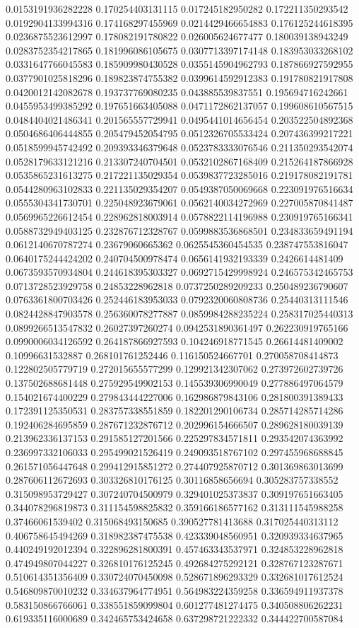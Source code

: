 \begin{table}
\begin{tabu}
\begin{sparkline}{10}
0.0153191936282228 0.170254403131115 0.017245182950282 0.172211350293542 0.0192904133994316 0.174168297455969 0.0214429466654883 0.176125244618395 0.0236875523612997 0.178082191780822 0.026005624677477 0.180039138943249 0.0283752354217865 0.181996086105675 0.0307713397174148 0.183953033268102 0.0331647766045583 0.185909980430528 0.0355145904962793 0.187866927592955 0.0377901025818296 0.189823874755382 0.0399614592912383 0.191780821917808 0.0420012142082678 0.193737769080235 0.043885539837551 0.195694716242661 0.0455953499385292 0.197651663405088 0.0471172862137057 0.199608610567515 0.0484404021486341 0.201565557729941 0.0495441014656454 0.203522504892368 0.0504686406444855 0.205479452054795 0.0512326705533424 0.207436399217221 0.0518599945742492 0.209393346379648 0.0523783333076546 0.211350293542074 0.0528179633121216 0.213307240704501 0.0532102867168409 0.215264187866928 0.0535865231613275 0.217221135029354 0.0539837723285016 0.219178082191781 0.0544280963102833 0.221135029354207 0.0549387050069668 0.223091976516634 0.0555304341730701 0.225048923679061 0.0562140034272969 0.227005870841487 0.0569965226612454 0.228962818003914 0.0578822114196988 0.230919765166341 0.0588732949403125 0.232876712328767 0.0599883536868501 0.234833659491194 0.0612140670787274 0.23679060665362 0.0625545360454535 0.238747553816047 0.0640175244424202 0.240704500978474 0.0656141932193339 0.2426614481409 0.0673593570934804 0.244618395303327 0.0692715429998924 0.246575342465753 0.0713728523929758 0.24853228962818 0.0737250289209233 0.250489236790607 0.0763361800703426 0.252446183953033 0.0792320060808736 0.25440313111546 0.0824428847903578 0.256360078277887 0.0859984288235224 0.258317025440313 0.0899266513547832 0.26027397260274 0.0942531890361497 0.262230919765166 0.0990006034126592 0.264187866927593 0.104246918771545 0.26614481409002 0.10996631532887 0.268101761252446 0.116150524667701 0.270058708414873 0.122802505779719 0.272015655577299 0.129921342307062 0.273972602739726 0.137502688681448 0.275929549902153 0.145539306990049 0.277886497064579 0.154021674400229 0.279843444227006 0.162986879843106 0.281800391389433 0.172391125350531 0.283757338551859 0.182201290106734 0.285714285714286 0.192406284695859 0.287671232876712 0.202996154666507 0.289628180039139 0.213962336137153 0.291585127201566 0.225297834571811 0.293542074363992 0.236997332106033 0.295499021526419 0.249093518767102 0.297455968688845 0.261571056447648 0.299412915851272 0.274407925870712 0.301369863013699 0.287606112672693 0.303326810176125 0.30116858656694 0.305283757338552 0.315098953729427 0.307240704500979 0.329401025373837 0.309197651663405 0.344078296819873 0.311154598825832 0.359166186577162 0.313111545988258 0.37466061539402 0.315068493150685 0.390527781413688 0.317025440313112 0.406758645494269 0.318982387475538 0.423339048560951 0.320939334637965 0.440249192012394 0.322896281800391 0.457463343537971 0.324853228962818 0.474949807044227 0.326810176125245 0.492684275292121 0.328767123287671 0.510614351356409 0.330724070450098 0.528671896293329 0.332681017612524 0.546809870010232 0.334637964774951 0.564983224359258 0.336594911937378 0.583150866766061 0.338551859099804 0.601277481274475 0.340508806262231 0.619335116000689 0.342465753424658 0.637298721222332 0.344422700587084 
\end{sparkline}
\end{tabu}
\end{table}
